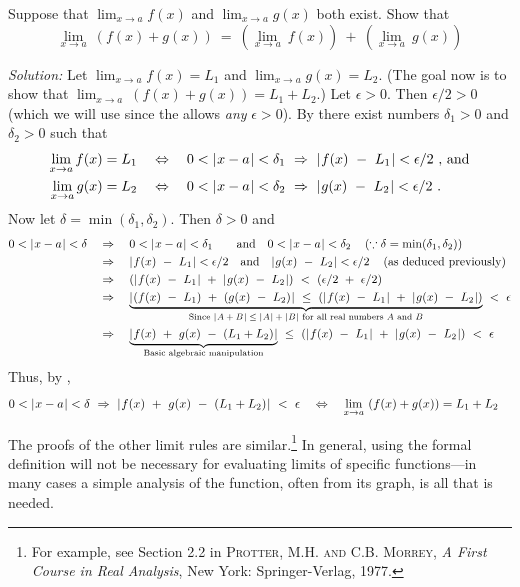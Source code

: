 \begin{exmp}\label{exmp:limsum}
 Suppose that $\displaystyle\lim_{x \to a} f(x)$ and
 $\displaystyle\lim_{x \to a} g(x)$ both exist. Show that
 \[
 \lim_{x \to a} ~(f(x) + g(x)) ~=~
  \left(\lim_{x \to a} ~f(x)\right) ~+~
  \left(\lim_{x \to a} ~g(x)\right)
\]
\par\noindent\emph{Solution:} Let $\displaystyle\lim_{x \to a} f(x) = L_1$ and
$\displaystyle\lim_{x \to a} g(x) = L_2$. (The goal now is to show that
$\displaystyle\lim_{x \to a} ~(f(x) + g(x)) = L_1 + L_2$.) Let $\epsilon > 0$.
Then $\epsilon/2 > 0$ (which we will use since the
 allows \emph{any} $\epsilon > 0$). By
 there exist numbers $\delta_1 > 0$ and
$\delta_2 > 0$ such that
\begin{align*}
 \lim_{x \to a} f(x) = L_1 \quad\Leftrightarrow\quad 0 < \lvert\mspace{1mu}x - a\mspace{1mu}\rvert < \delta_1 ~&\Rightarrow~ \lvert\mspace{1mu}f(x) ~-~ L_1\mspace{1mu}\rvert < \epsilon/2~\text{, and}\\
 \lim_{x \to a} g(x) = L_2 \quad\Leftrightarrow\quad 0 < \lvert\mspace{1mu}x - a\mspace{1mu}\rvert < \delta_2 ~&\Rightarrow~ \lvert\mspace{1mu}g(x) ~-~ L_2\mspace{1mu}\rvert < \epsilon/2 ~.
\end{align*}
\indent Now let $\delta = \min(\delta_1, \delta_2)$. Then $\delta > 0$ and
\begin{align*}
 0 < \lvert\mspace{1mu}x - a\mspace{1mu}\rvert < \delta \quad&\Rightarrow\quad
 0 < \lvert\mspace{1mu}x - a\mspace{1mu}\rvert < \delta_1 \qquad\text{and}\quad 0 < \lvert\mspace{1mu}x - a\mspace{1mu}\rvert < \delta_2 \quad\left(\because \delta = \min(\delta_1, \delta_2)\right)\\
 &\Rightarrow\quad \lvert\mspace{1mu}f(x) ~-~ L_1\mspace{1mu}\rvert < \epsilon/2 \quad\text{and}\quad
 \lvert\mspace{1mu}g(x) ~-~ L_2\mspace{1mu}\rvert < \epsilon/2 \quad\left(\text{as deduced previously}\right)\\
 &\Rightarrow\quad \left(\lvert\mspace{1mu}f(x) ~-~ L_1\mspace{1mu}\rvert ~+~ \lvert\mspace{1mu}g(x) ~-~ L_2\mspace{1mu}\rvert\right) ~<~ \left(\epsilon/2 ~+~ \epsilon/2\right)\\
 &\Rightarrow\quad \underbrace{\lvert\mspace{1mu}(f(x) ~-~ L_1) ~+~ (g(x) ~-~ L_2)\mspace{1mu}\rvert
   ~\le~ \left(\lvert\mspace{1mu}f(x) ~-~ L_1\mspace{1mu}\rvert ~+~ \lvert\mspace{1mu}g(x) ~-~
     L_2\mspace{1mu}\rvert\right)}_\text{Since $\lvert\mspace{1mu}A+B\mspace{1mu}\rvert \le \lvert\mspace{1mu}A\mspace{1mu}\rvert + \lvert\mspace{1mu}B\mspace{1mu}\rvert$ for
   all real numbers $A$ and $B$} ~<~ \epsilon\\
 &\Rightarrow\quad \underbrace{\lvert\mspace{1mu}f(x) ~+~ g(x) ~-~ (L_1 +
     L_2)\mspace{1mu}\rvert}_\text{Basic algebraic manipulation} ~\le~ \left(\lvert\mspace{1mu}f(x)
   ~-~ L_1\mspace{1mu}\rvert ~+~ \lvert\mspace{1mu}g(x) ~-~ L_2\mspace{1mu}\rvert\right) ~<~ \epsilon
\end{align*}
\indent Thus, by ,
\[
 0 < \lvert\mspace{1mu}x-a\mspace{1mu}\rvert < \delta ~\Rightarrow~
 \lvert\mspace{1mu}f(x) ~+~ g(x) ~-~ (L_1 + L_2)\mspace{1mu}\rvert ~<~ \epsilon
 \quad\Leftrightarrow\quad \lim_{x \to a} ~(f(x) + g(x)) = L_1 + L_2
 \quad\relax
\]
\end{exmp}
\divider
\newpage
The proofs of the other limit rules are similar.\footnote{For example, see
Section 2.2 in \textsc{Protter, M.H. and C.B. Morrey}, \emph{A First Course in
Real Analysis}, New York: Springer-Verlag, 1977.} In general, using the formal
definition will not be necessary for evaluating limits of specific
functions---in many cases a simple analysis of the function, often from its graph, is all that is
needed.

